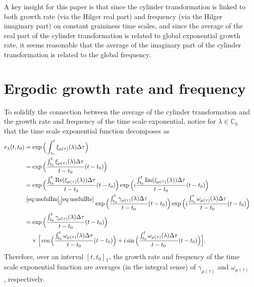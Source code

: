 \documentclass[10pt,a4paper]{amsart}
\DeclareMathOperator{\myRe}{Re}
\DeclareMathOperator{\myIm}{Im}
\numberwithin{equation}{section}
\begin{document}
A key insight for this paper is that since the cylinder transformation is linked to both
growth rate (via the Hilger real part) and frequency (via the Hilger imaginary part) on
constant graininess time scales, and since the average of the real part of the cylinder
transformation is related to global exponential growth rate, it seems reasonable that
the average of the imaginary part of the cylinder transformation is related to the
global frequency. 


\section{Ergodic growth rate and frequency}

To solidify the connection between the average of the cylinder transformation and the
growth rate and frequency of the time scale exponential, notice for $\lambda \in \mathbb{C}_h$
that the time scale exponential function decomposes as
\begin{equation} \label{eq:exp_gamma_omega}
\begin{aligned}
 e_{\lambda}(t,t_0)
 &=  \exp\Big(\int_{t_0}^{t} \xi_{\mu(\tau)}(\lambda) \Delta \tau \Big) \\
 &= \exp\Big( \frac{\int_{t_0}^{t} \xi_{\mu(\tau)}(\lambda) \Delta \tau}
  {t-t_0} (t-t_0) \Big) \\
 &= \exp\Big( \frac{\int_{t_0}^{t} \myRe(\xi_{\mu(\tau)}(\lambda))
  \Delta \tau}{t-t_0} (t-t_0) \Big)
  \exp\Big( i \frac{\int_{t_0}^{t} \myIm(\xi_{\mu(\tau)}(\lambda)) \Delta \tau}{t-t_0}
   (t-t_0) \Big) \\
 &\overset{\eqref{eq:usefulIm},\eqref{eq:usefulRe}}{=}
 \exp\Big( \frac{\int_{t_0}^{t} \gamma_{\mu(\tau)}(\lambda) \Delta \tau}{t-t_0}
  (t-t_0) \Big)
  \exp\Big( i \frac{\int_{t_0}^{t} \omega_{\mu(\tau)}(\lambda) \Delta \tau}{t-t_0}
  (t-t_0) \Big) \\
 &=  \exp\Big( \frac{\int_{t_0}^{t} \gamma_{\mu(\tau)}(\lambda) \Delta \tau}{t-t_0}
  (t-t_0) \Big)   \\
 &\quad \times \Big[\cos\Big( \frac{\int_{t_0}^{t} \omega_{\mu(\tau)}(\lambda)
 \Delta \tau}{t-t_0} (t-t_0) \Big) + i \sin\Big( \frac{\int_{t_0}^{t}
 \omega_{\mu(\tau)}(\lambda) \Delta \tau}{t-t_0} (t-t_0) \Big) \Big].
 \end{aligned}
\end{equation}
Therefore, over an interval $[t,t_0]_{\mathbb{T}}$, the growth rate and frequency of the
time scale exponential function are averages (in the integral sense) of
$\gamma_{\mu(\tau)}$ and $\omega_{\mu(\tau)}$, respectively.
\end{document}
